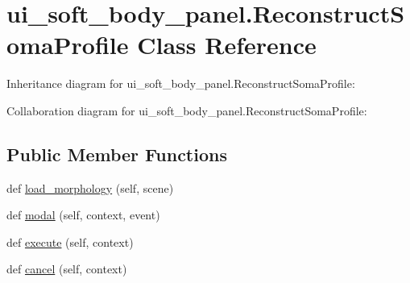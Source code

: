 \hypertarget{classui__soft__body__panel_1_1ReconstructSomaProfile}{}\section{ui\+\_\+soft\+\_\+body\+\_\+panel.\+Reconstruct\+Soma\+Profile Class Reference}
\label{classui__soft__body__panel_1_1ReconstructSomaProfile}


Inheritance diagram for ui\+\_\+soft\+\_\+body\+\_\+panel.\+Reconstruct\+Soma\+Profile\+:


Collaboration diagram for ui\+\_\+soft\+\_\+body\+\_\+panel.\+Reconstruct\+Soma\+Profile\+:
\subsection*{Public Member Functions}
\begin{DoxyCompactItemize}
\item 
def \hyperlink{classui__soft__body__panel_1_1ReconstructSomaProfile_a90855b4e9ae27e5daf41ecebff0a3482}{load\+\_\+morphology} (self, scene)
\item 
def \hyperlink{classui__soft__body__panel_1_1ReconstructSomaProfile_a117f07d8992f9bf4a32e1dcf86d19a2c}{modal} (self, context, event)
\item 
def \hyperlink{classui__soft__body__panel_1_1ReconstructSomaProfile_a854efe7f6173e4d64c987dc5bfcee3a4}{execute} (self, context)
\item 
def \hyperlink{classui__soft__body__panel_1_1ReconstructSomaProfile_a0d57b9b4518c7803eadf7a3e83d51f9b}{cancel} (self, context)
\end{DoxyCompactItemize}
